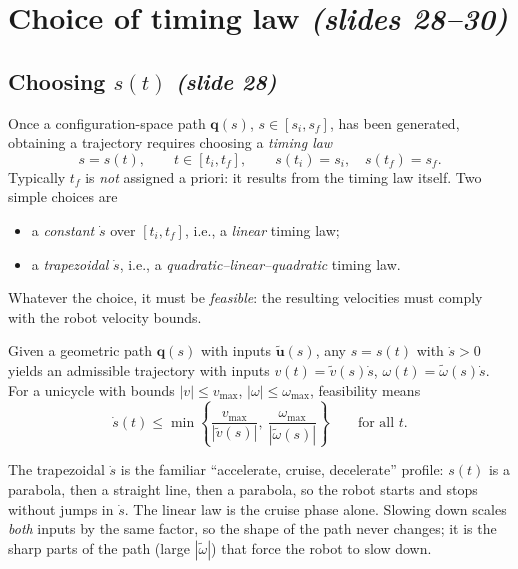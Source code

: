 \documentclass[11pt,a4paper]{article}
\newcommand{\q}{\boldsymbol{q}}
\newcommand{\ut}{\tilde{\boldsymbol{u}}}
\newcommand{\vt}{\tilde v}
\newcommand{\wt}{\tilde\omega}
\theoremstyle{definition}
\theoremstyle{plain}
\theoremstyle{remark}
\begin{document}
\section{Choice of timing law \emph{(slides 28--30)}}
 
\subsection{Choosing $s(t)$ \emph{(slide 28)}}
 
Once a configuration-space path $\q(s)$, $s\in[s_i,s_f]$, has been generated, obtaining a trajectory requires choosing a
\emph{timing law}
\begin{equation}
s=s(t),\qquad t\in[t_i,t_f],\qquad s(t_i)=s_i,\quad s(t_f)=s_f .
\end{equation}
Typically $t_f$ is \emph{not} assigned a priori: it results from the timing law itself. Two simple choices are
\begin{itemize}[nosep]
\item a \emph{constant} $\dot s$ over $[t_i,t_f]$, i.e., a \emph{linear} timing law;
\item a \emph{trapezoidal} $\dot s$, i.e., a \emph{quadratic--linear--quadratic} timing law.
\end{itemize}
Whatever the choice, it must be \emph{feasible}: the resulting velocities must comply with the robot velocity bounds.
 
Given a geometric path $\q(s)$ with inputs $\ut(s)$, any $s=s(t)$ with $\dot s>0$ yields an admissible trajectory with inputs
$v(t)=\vt(s)\dot s$, $\omega(t)=\wt(s)\dot s$. For a unicycle with bounds $|v|\le v_{\max}$, $|\omega|\le\omega_{\max}$, feasibility means
\[
\dot s(t)\le\min\left\{\frac{v_{\max}}{|\vt(s)|},\ \frac{\omega_{\max}}{|\wt(s)|}\right\}\qquad\text{for all } t .
\]
 
\begin{intuition}
The trapezoidal $\dot s$ is the familiar ``accelerate, cruise, decelerate'' profile: $s(t)$ is a parabola, then a straight line, then a
parabola, so the robot starts and stops without jumps in $\dot s$. The linear law is the cruise phase alone. Slowing down scales
\emph{both} inputs by the same factor, so the shape of the path never changes; it is the sharp parts of the path (large $|\wt|$) that
force the robot to slow down.
\end{intuition}
 
\end{document}
